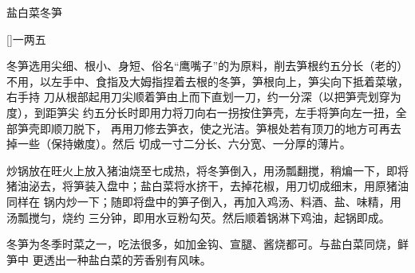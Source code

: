 \begin{recipe}{盐白菜冬笋}

\ingredients

[\footnotemark]{一两五}

\preparation

\step 冬笋选用尖细、根小、身短、俗名“鹰嘴子”的为原料，削去笋根约五分长（老的）
不用，以左手中、食指及大姆指捏着去根的冬笋，笋根向上，笋尖向下抵着菜墩，右手持
刀从根部起用刀尖顺着笋由上而下直划一刀，约一分深（以把笋壳划穿为度），到距笋尖
约五分长时即用力将刀向右一拐按住笋壳，左手将笋向左一扭，全部笋壳即顺刀脱下，
再用刀修去笋衣，使之光洁。笋根处若有顶刀的地方可再去掉一些（保持嫩度）。然后
切成一寸二分长、六分宽、一分厚的薄片。

\step 炒锅放在旺火上放入猪油烧至七成热，将冬笋倒入，用汤瓢翻搅，稍煸一下，即将
猪油泌去，将笋装入盘中；盐白菜将水挤干，去掉花椒，用刀切成细末，用原猪油同样在
锅内炒一下；随即将盘中的笋子倒入，再加入鸡汤、料酒、盐、味精，用汤瓢搅匀，烧约
三分钟，即用水豆粉勾芡。然后顺着锅淋下鸡油，起锅即成。

\features

冬笋为冬季时菜之一，吃法很多，如加金钩、宣腿、酱烧都可。与盐白菜同烧，鲜笋中
更透出一种盐白菜的芳香别有风味。


\end{recipe}

